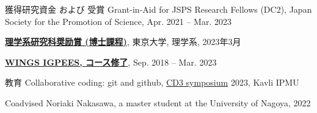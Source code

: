 
\begin{rSection}{獲得研究資金 および 受賞}
  Grant-in-Aid for JSPS Research Fellows (DC2), Japan Society for the Promotion of Science, Apr. 2021 -- Mar. 2023

  {\textbf{\href{https://www.phys.s.u-tokyo.ac.jp/award/37776/}{理学系研究科奨励賞 (博士課程)}}}, 東京大学, 理学系, 2023年3月

  {\textbf{\href{https://www.s.u-tokyo.ac.jp/en/IGPEES/}{WINGS IGPEES, コース修了}}}, Sep. 2018 -- Mar. 2023
\end{rSection}

\begin{rSection}{教育}
  Collaborative coding: git and github, \href{https://cd3.ipmu.jp/opening/}{CD3 symposium} 2023, Kavli IPMU

  Coadvised Noriaki Nakasawa, a master student at the University of Nagoya, 2022
\end{rSection}


